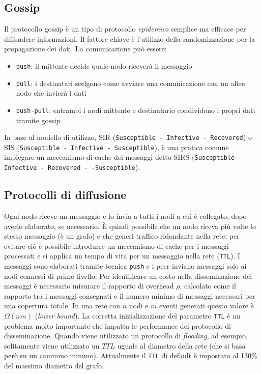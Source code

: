 \begin{appendices}
    \chapter{Gossip}\label{appendix:gossip}
    Il protocollo gossip è un tipo di protocollo \textit{epidemico} semplice ma efficace per diffondere informazioni. Il fattore chiave è l'utilizzo della randomizzazione per la propagazione dei dati.\newline
    La comunicazione può essere:
    \begin{itemize}
        \item \texttt{push}: il mittente decide quale nodo riceverà il messaggio
        \item \texttt{pull}: i destinatari scelgono come avviare una comunicazione con un altro nodo che invierà i dati
        \item \texttt{push-pull}: entrambi i nodi mittente e destinatario condividono i propri dati tramite gossip
    \end{itemize}
    In base al modello di utilizzo, SIR (\texttt{Susceptible - Infective - Recovered}) o SIS (\texttt{Susceptible - Infective - Susceptible}), è una pratica comune impiegare un meccanismo di cache dei messaggi detto SIRS (\texttt{Susceptible - Infective - Recovered - -Susceptible}).
    
    \section{Protocolli di diffusione}
    Ogni nodo riceve un messaggio e lo invia a tutti i nodi a cui è collegato, dopo averlo elaborato, se necessario. È quindi possibile che un nodo riceva più volte lo stesso messaggio (è un grafo) e che generi traffico ridondante nella rete; per evitare ciò è possibile introdurre un meccanismo di cache per i messaggi processati e si applica un tempo di vita per un messaggio nella rete (\texttt{TTL}).\newline
    I messaggi sono elaborati tramite tecnica \texttt{push} e i peer inviano messaggi solo ai nodi connessi di primo livello.\newline
    Per identificare un costo nella disseminazione dei messaggi è necessario misurare il rapporto di overhead $\rho$, calcolato come il rapporto tra i messaggi consegnati e il numero minimo di messaggi necessari per una copertura totale. In una rete con $n$ nodi e $m$ eventi generati questo valore è $\Omega(nm)$ (\textit{lower bound}).\newline
    La corretta inizializzazione del parametro \texttt{TTL} è un problema molto importante che impatta le performance del protocollo di disseminazione. Quando viene utilizzato un protocollo di \textit{flooding}, ad esempio, solitamente viene utilizzato un $TTL$ uguale al diametro della rete (che si basa però su un cammino minimo). Attualmente il \texttt{TTL} di default è impostato al 130\% del massimo diametro del grafo.
    

\end{appendices}
